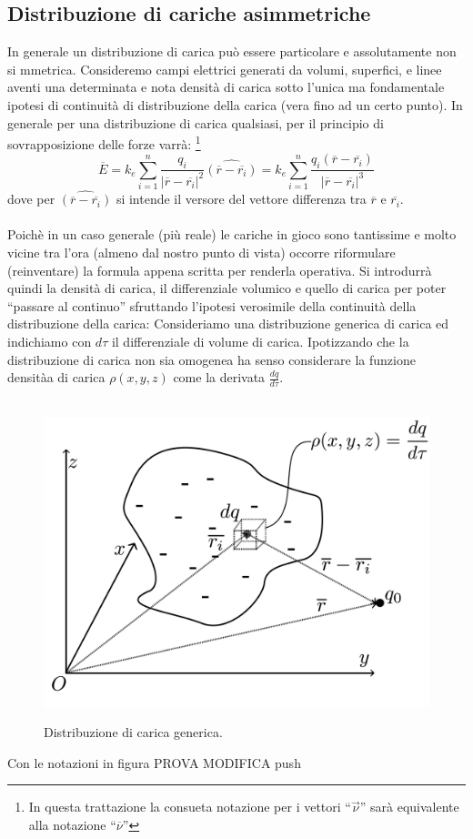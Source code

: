 \documentclass[11pt]{article}
\begin{document}
\subsection{Distribuzione di cariche asimmetriche}
In generale un distribuzione di carica può essere particolare e assolutamente non si mmetrica. Consideremo campi elettrici generati da volumi, superfici, e linee aventi una determinata e nota densità di carica sotto l'unica ma fondamentale ipotesi di continuità di distribuzione della carica (vera fino ad un certo punto).
In generale per una distribuzione di carica qualsiasi, per il principio di sovrapposizione delle forze varrà:
\footnote{In questa trattazione la consueta notazione per i vettori ``$\overrightarrow{\nu}$'' sarà equivalente alla notazione ``$\overline{\nu}$''}$$\overline{E}=k_e\sum_{i=1}^{n}\frac{q_i}{|\overline{r}-\overline{r_i}|^2}\widehat{(\overline{r}-\overline{r_i})}=k_e\sum_{i=1}^{n}\frac{q_i(\overline{r}-\overline{r_i})}{|\overline{r}-\overline{r_i}|^3}$$
dove per $\widehat{(\overline{r}-\overline{r_i})}$ si intende il versore del vettore differenza tra $\overline{r}$ e $\overline{r_i}$.
\\\\Poichè in un caso generale (più reale) le cariche in gioco sono tantissime e molto vicine tra l'ora (almeno dal nostro punto di vista) occorre riformulare (reinventare) la formula appena scritta per renderla operativa.
Si introdurrà quindi la densità di carica, il differenziale volumico e quello di carica per poter ``passare al continuo'' sfruttando l'ipotesi verosimile della continuità della distribuzione della carica:
\newpage
Consideriamo una distribuzione generica di carica ed indichiamo con $d\tau$ il differenziale di volume di carica. Ipotizzando che la distribuzione di carica non sia omogenea ha senso considerare la funzione densitàa di carica $\rho(x,y,z)$ come la derivata $\frac{dq}{d\tau}$.
 \begin{center}
\begin{figure}[H]
			  \vspace{-10pt}
              \hspace{-90pt}
              ~~~~~~~~~~~~~~~~~~~~~~~~~~~~~~~~ \includegraphics[scale=0.22]{distribuzione}
               \caption{\small{Distribuzione di carica generica.}}
               \end{figure} 
               \end{center}
               Con le notazioni in figura
PROVA MODIFICA push
\end{document}
